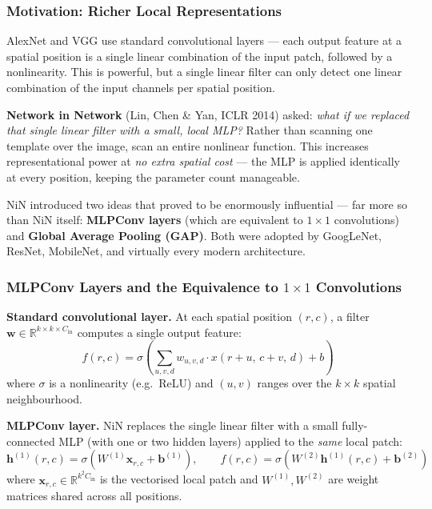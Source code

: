 \documentclass[11pt,a4paper]{article}
\newcommand{\term}[1]{\textcolor{DefGreen}{\textbf{#1}}\index{#1}}
\begin{document}
\subsubsection{Motivation: Richer Local Representations}

AlexNet and VGG use standard convolutional layers — each output feature at a spatial position is a single linear combination of the input patch, followed by a nonlinearity.  This is powerful, but a single linear filter can only detect one linear combination of the input channels per spatial position.

\term{Network in Network} (Lin, Chen \& Yan, ICLR 2014) asked: \emph{what if we replaced that single linear filter with a small, local MLP?}  Rather than scanning one template over the image, scan an entire nonlinear function.  This increases representational power at \emph{no extra spatial cost} — the MLP is applied identically at every position, keeping the parameter count manageable.

NiN introduced two ideas that proved to be enormously influential — far more so than NiN itself: \textbf{MLPConv layers} (which are equivalent to $1\times1$ convolutions) and \textbf{Global Average Pooling (GAP)}.  Both were adopted by GoogLeNet, ResNet, MobileNet, and virtually every modern architecture.

\subsubsection{MLPConv Layers and the Equivalence to $1\times1$ Convolutions}

\textbf{Standard convolutional layer.}  At each spatial position $(r,c)$, a filter $\mathbf{w} \in \mathbb{R}^{k\times k \times C_\text{in}}$ computes a single output feature:
\[
f(r,c) = \sigma\!\left(\sum_{u,v,d} w_{u,v,d}\cdot x(r{+}u,\, c{+}v,\, d) + b\right)
\]
where $\sigma$ is a nonlinearity (e.g.\ ReLU) and $(u,v)$ ranges over the $k\times k$ spatial neighbourhood.

\textbf{MLPConv layer.}  NiN replaces the single linear filter with a small fully-connected MLP (with one or two hidden layers) applied to the \emph{same} local patch:
\[
\mathbf{h}^{(1)}(r,c) = \sigma\!\left(W^{(1)} \mathbf{x}_{r,c} + \mathbf{b}^{(1)}\right), \qquad
f(r,c) = \sigma\!\left(W^{(2)} \mathbf{h}^{(1)}(r,c) + \mathbf{b}^{(2)}\right)
\]
where $\mathbf{x}_{r,c} \in \mathbb{R}^{k^2 C_\text{in}}$ is the vectorised local patch and $W^{(1)}, W^{(2)}$ are weight matrices shared across all positions.
\end{document}
